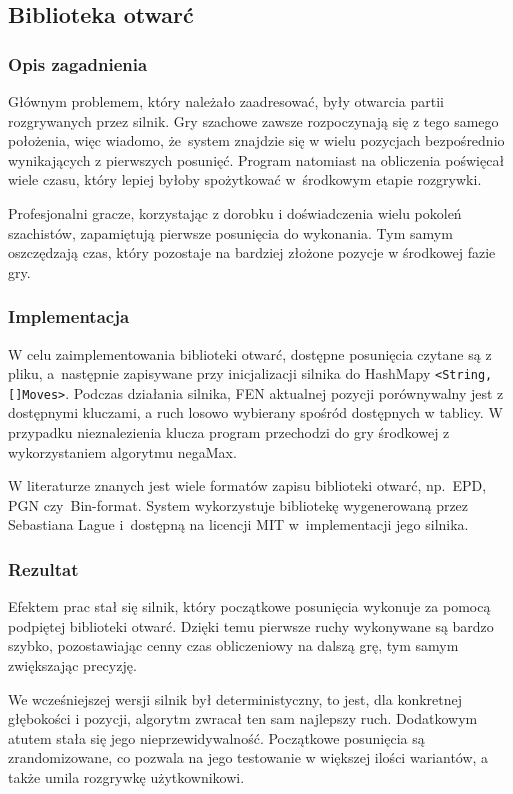 \subsection{Biblioteka otwarć}
\label{subsec:biblioteka-otwarc}

\subsubsection{Opis zagadnienia}
Głównym problemem, który należało zaadresować, były otwarcia partii rozgrywanych przez silnik.
Gry szachowe zawsze rozpoczynają się z tego samego położenia, więc wiadomo, że~system znajdzie się w wielu pozycjach bezpośrednio wynikających z pierwszych posunięć.
Program natomiast na obliczenia poświęcał wiele czasu, który lepiej byłoby spożytkować w~środkowym etapie rozgrywki.

Profesjonalni gracze, korzystając z dorobku i doświadczenia wielu pokoleń szachistów, zapamiętują pierwsze posunięcia do wykonania.
Tym samym oszczędzają czas, który pozostaje na bardziej złożone pozycje w środkowej fazie gry.

\subsubsection{Implementacja}
W celu zaimplementowania biblioteki otwarć, dostępne posunięcia czytane są z pliku, a~następnie zapisywane przy inicjalizacji silnika do HashMapy \texttt{<String, []Moves>}.
Podczas działania silnika, FEN aktualnej pozycji porównywalny jest z dostępnymi kluczami, a ruch losowo wybierany spośród dostępnych w tablicy.
W przypadku nieznalezienia klucza program przechodzi do gry środkowej z wykorzystaniem algorytmu negaMax.

W literaturze znanych jest wiele formatów zapisu biblioteki otwarć, np.\ EPD, PGN czy~Bin-format.
System wykorzystuje bibliotekę wygenerowaną przez Sebastiana Lague i~dostępną na licencji MIT w~implementacji jego silnika. \cite*{opening-library}
\subsubsection{Rezultat}
Efektem prac stał się silnik, który początkowe posunięcia wykonuje za pomocą podpiętej biblioteki otwarć.
Dzięki temu pierwsze ruchy wykonywane są bardzo szybko, pozostawiając cenny czas obliczeniowy na dalszą grę, tym samym zwiększając precyzję.

We wcześniejszej wersji silnik był deterministyczny, to jest, dla konkretnej głębokości i pozycji, algorytm zwracał ten sam najlepszy ruch.
Dodatkowym atutem stała się jego nieprzewidywalność.
Początkowe posunięcia są zrandomizowane, co pozwala na jego testowanie w większej ilości wariantów, a także umila rozgrywkę użytkownikowi.
